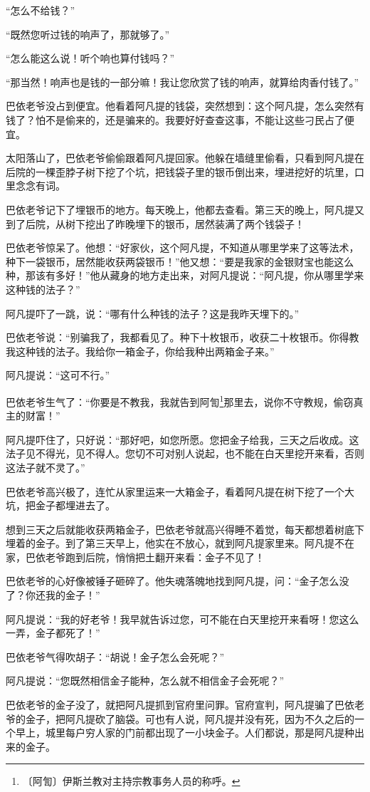 \documentclass[12pt,UTF-8,openany]{ctexbook}
\begin{document}
\begin{Large}
    “怎么不给钱？”
    
    “既然您听过钱的响声了，那就够了。”
    
    “怎么能这么说！听个响也算付钱吗？”
    
    “那当然！响声也是钱的一部分嘛！我让您欣赏了钱的响声，就算给肉香付钱了。”
    
    巴依老爷没占到便宜。他看着阿凡提的钱袋，突然想到：这个阿凡提，怎么突然有钱了？怕不是偷来的，还是骗来的。我要好好查查这事，不能让这些刁民占了便宜。
    
    太阳落山了，巴依老爷偷偷跟着阿凡提回家。他躲在墙缝里偷看，只看到阿凡提在后院的一棵歪脖子树下挖了个坑，把钱袋子里的银币倒出来，埋进挖好的坑里，口里念念有词。
    
    巴依老爷记下了埋银币的地方。每天晚上，他都去查看。第三天的晚上，阿凡提又到了后院，从树下挖出了昨晚埋下的银币，居然装满了两个钱袋子！
    
    巴依老爷惊呆了。他想：“好家伙，这个阿凡提，不知道从哪里学来了这等法术，种下一袋银币，居然能收获两袋银币！”他又想：“要是我家的金银财宝也能这么种，那该有多好！”他从藏身的地方走出来，对阿凡提说：“阿凡提，你从哪里学来这种钱的法子？”
    
    阿凡提吓了一跳，说：“哪有什么种钱的法子？这是我昨天埋下的。”
    
    巴依老爷说：“别骗我了，我都看见了。种下十枚银币，收获二十枚银币。你得教我这种钱的法子。我给你一箱金子，你给我种出两箱金子来。”
    
    阿凡提说：“这可不行。”
    
    巴依老爷生气了：“你要是不教我，我就告到阿訇\footnote{〔阿訇〕伊斯兰教对主持宗教事务人员的称呼。}那里去，说你不守教规，偷窃真主的财富！”
    
    阿凡提吓住了，只好说：“那好吧，如您所愿。您把金子给我，三天之后收成。这法子见不得光，见不得人。您切不可对别人说起，也不能在白天里挖开来看，否则这法子就不灵了。”
    
    巴依老爷高兴极了，连忙从家里运来一大箱金子，看着阿凡提在树下挖了一个大坑，把金子都埋进去了。
    
    想到三天之后就能收获两箱金子，巴依老爷就高兴得睡不着觉，每天都想着树底下埋着的金子。到了第三天早上，他实在不放心，就到阿凡提家里来。阿凡提不在家，巴依老爷跑到后院，悄悄把土翻开来看：金子不见了！
    
    巴依老爷的心好像被锤子砸碎了。他失魂落魄地找到阿凡提，问：“金子怎么没了？你还我的金子！”
    
    阿凡提说：“我的好老爷！我早就告诉过您，可不能在白天里挖开来看呀！您这么一弄，金子都死了！”
    
    巴依老爷气得吹胡子：“胡说！金子怎么会死呢？”
    
    阿凡提说：“您既然相信金子能种，怎么就不相信金子会死呢？”
    
    巴依老爷的金子没了，就把阿凡提抓到官府里问罪。官府宣判，阿凡提骗了巴依老爷的金子，把阿凡提砍了脑袋。可也有人说，阿凡提并没有死，因为不久之后的一个早上，城里每户穷人家的门前都出现了一小块金子。人们都说，那是阿凡提种出来的金子。
    
\end{Large}
\end{document}
